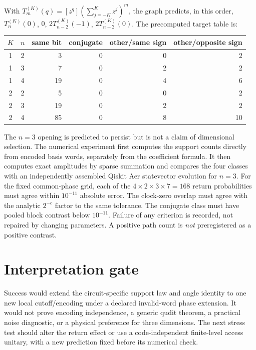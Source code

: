 \documentclass[10pt,a4paper]{article}
\begin{document}
With $T_m^{(K)}(q)=[z^q](\sum_{j=-K}^{K}z^j)^m$, the graph predicts, in this order, $T_n^{(K)}(0)$, $0$, $2T_{n-2}^{(K)}(-1)$, $2T_{n-2}^{(K)}(0)$. The precomputed target table is:
\begin{center}
\begin{tabular}{@{}c c r r r r@{}}\toprule
$K$ & $n$ & same bit & conjugate & other/same sign & other/opposite sign\\\midrule
1 & 2 & 3 & 0 & 0 & 2\\
1 & 3 & 7 & 0 & 2 & 2\\
1 & 4 & 19 & 0 & 4 & 6\\
2 & 2 & 5 & 0 & 0 & 2\\
2 & 3 & 19 & 0 & 2 & 2\\
2 & 4 & 85 & 0 & 8 & 10\\\bottomrule
\end{tabular}
\end{center}
The $n=3$ opening is predicted to persist but is not a claim of dimensional selection. The numerical experiment first computes the support counts directly from encoded basis words, separately from the coefficient formula. It then computes exact amplitudes by sparse summation and compares the four classes with an independently assembled Qiskit Aer statevector evolution for $n=3$. For the fixed common-phase grid, each of the $4\times2\times3\times7=168$ return probabilities must agree within $10^{-11}$ absolute error. The clock-zero overlap must agree with the analytic $2^{-c}$ factor to the same tolerance. The conjugate class must have pooled block contrast below $10^{-11}$. Failure of any criterion is recorded, not repaired by changing parameters. A positive path count is \emph{not} preregistered as a positive contrast.

\section*{Interpretation gate}
Success would extend the circuit-specific support law and angle identity to one new local cutoff/encoding under a declared invalid-word phase extension. It would not prove encoding independence, a generic qudit theorem, a practical noise diagnostic, or a physical preference for three dimensions. The next stress test should alter the return effect or use a code-independent finite-level access unitary, with a new prediction fixed before its numerical check.
\end{document}

